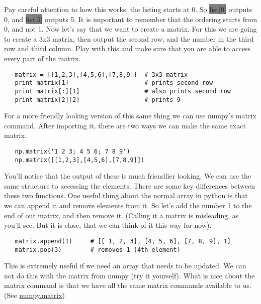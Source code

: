 \documentclass[11pt]{article}   %
\newcommand{\gray}[1]{\colorbox{gray}{#1}}
\begin{document}
Pay careful attention to how this works, the listing starts at 0.  So \gray{list[0]} outputs 0, and \gray{list[5]} outputs 5.  It is important to remember that the ordering starts
from 0, and not 1.  Now let's say that we want to create a matrix.  For this we are going to create a 3x3 matrix, then output the second row, and the number in the third row and third 
column. Play with this and make sure that you are able to access every part of the matrix.  
\begin{tcolorbox}
   \begin{lstlisting}
   matrix = [[1,2,3],[4,5,6],[7,8,9]]  # 3x3 matrix
   print matrix[1]                     # prints second row
   print matrix[:][1]                  # also prints second row
   print matrix[2][2]                  # prints 9
   \end{lstlisting}
\end{tcolorbox}
For a more friendly looking version of this same thing we can use numpy's matrix command.  After importing it, there are two ways we can make the same exact matrix.
\begin{tcolorbox}
   \begin{lstlisting}
   np.matrix('1 2 3; 4 5 6; 7 8 9')
   np.matrix([[1,2,3],[4,5,6],[7,8,9]])
   \end{lstlisting}
\end{tcolorbox}
You'll notice that the output of these is much friendlier looking.  We can use the same structure to accessing the elements.  There are some key differences between these two functions.
One useful thing about the normal array in python is that we can append it and remove elements from it.  So let's add the number 1 to the end of our matrix, and then remove it.  (Calling
it a matrix is misleading, as you'll see.  But it is close, that we can think of it this way for now).
\begin{tcolorbox}
   \begin{lstlisting}
   matrix.append(1)     # [[ 1, 2, 3], [4, 5, 6], [7, 8, 9], 1]
   matrix.pop(3)        # removes 1 (4th element)
   \end{lstlisting}
\end{tcolorbox}
This is extremely useful if we need an array that needs to be updated.  We can not do this with the matrix from numpy (try it yourself).  What is nice about the matrix command is that 
we have all the same matrix commands available to us. (See \href{http://docs.scipy.org/doc/numpy/reference/generated/numpy.matrix.html}{numpy.matrix})
\\
\end{document}
